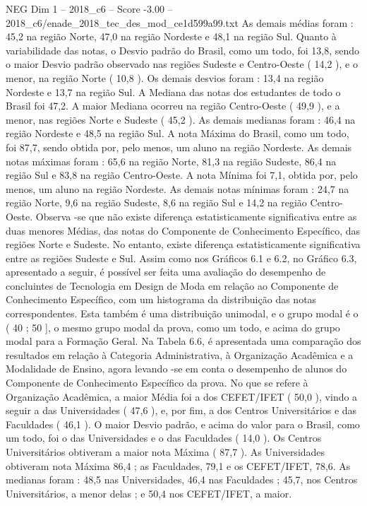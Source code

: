\begin{textsample}{NEG Dim 1 – 2018\_c6 – Score -3.00 – 2018\_c6/enade\_2018\_tec\_des\_mod\_ce1d599a99.txt}
As demais médias foram : 45,2 na região Norte, 47,0 na região Nordeste e 48,1 na região Sul.
Quanto à variabilidade das notas, o Desvio padrão do Brasil, como um todo, foi 13,8, sendo o maior Desvio padrão observado nas regiões Sudeste e Centro-Oeste ( 14,2 ), e o menor, na região Norte ( 10,8 ).
Os demais desvios foram : 13,4 na região Nordeste e 13,7 na região Sul.
A Mediana das notas dos estudantes de todo o Brasil foi 47,2.
A maior Mediana ocorreu na região Centro-Oeste ( 49,9 ), e a menor, nas regiões Norte e Sudeste ( 45,2 ).
As demais medianas foram : 46,4 na região Nordeste e 48,5 na região Sul.
A nota Máxima do Brasil, como um todo, foi 87,7, sendo obtida por, pelo menos, um aluno na região Nordeste.
As demais notas máximas foram : 65,6 na região Norte, 81,3 na região Sudeste, 86,4 na região Sul e 83,8 na região Centro-Oeste.
A nota Mínima foi 7,1, obtida por, pelo menos, um aluno na região Nordeste.
As demais notas mínimas foram : 24,7 na região Norte, 9,6 na região Sudeste, 8,6 na região Sul e 14,2 na região Centro-Oeste.
Observa -se que não existe diferença estatisticamente significativa entre as duas menores Médias, das notas do Componente de Conhecimento Específico, das regiões Norte e Sudeste.
No entanto, existe diferença estatisticamente significativa entre as regiões Sudeste e Sul.
Assim como nos Gráficos 6.1 e 6.2, no Gráfico 6.3, apresentado a seguir, é possível ser feita uma avaliação do desempenho de concluintes de Tecnologia em Design de Moda em relação ao Componente de Conhecimento Específico, com um histograma da distribuição das notas correspondentes.
Esta também é uma distribuição unimodal, e o grupo modal é o ( 40 ; 50 ], o mesmo grupo modal da prova, como um todo, e acima do grupo modal para a Formação Geral.
Na Tabela 6.6, é apresentada uma comparação dos resultados em relação à Categoria Administrativa, à Organização Acadêmica e a Modalidade de Ensino, agora levando -se em conta o desempenho de alunos do Componente de Conhecimento Específico da prova.
No que se refere à Organização Acadêmica, a maior Média foi a dos CEFET/IFET ( 50,0 ), vindo a seguir a das Universidades ( 47,6 ), e, por fim, a dos Centros Universitários e das Faculdades ( 46,1 ).
O maior Desvio padrão, e acima do valor para o Brasil, como um todo, foi o das Universidades e o das Faculdades ( 14,0 ).
Os Centros Universitários obtiveram a maior nota Máxima ( 87,7 ).
As Universidades obtiveram nota Máxima 86,4 ; as Faculdades, 79,1 e os CEFET/IFET, 78,6.
As medianas foram : 48,5 nas Universidades, 46,4 nas Faculdades ; 45,7, nos Centros Universitários, a menor delas ; e 50,4 nos CEFET/IFET, a maior.

\end{textsample}
